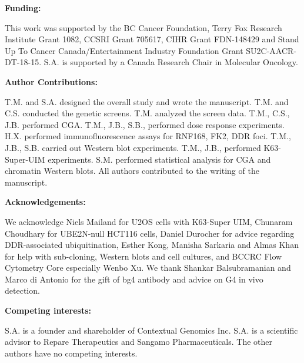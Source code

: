 \textbf{Funding:  }

This work was supported by the BC Cancer Foundation, Terry Fox Research Institute Grant 1082, CCSRI Grant 705617, CIHR Grant FDN-148429 and Stand Up To Cancer Canada/Entertainment Industry Foundation Grant SU2C-AACR-DT-18-15. S.A. is supported by a Canada Research Chair in Molecular Oncology.

\textbf{Author Contributions:  }

T.M. and S.A. designed the overall study and wrote the manuscript. T.M. and C.S. conducted the genetic screens. T.M. analyzed the screen data. T.M., C.S., J.B. performed CGA. T.M., J.B., S.B., performed dose response experiments. H.X. performed immunofluorescence assays for RNF168, FK2, DDR foci. T.M., J.B., S.B. carried out Western blot experiments. T.M., J.B., performed K63-Super-UIM experiments. S.M. performed statistical analysis for CGA and chromatin Western blots. All authors contributed to the writing of the manuscript.    

\textbf{Acknowledgements:  }

We acknowledge Niels Mailand for U2OS cells with K63-Super UIM, Chunaram Choudhary for UBE2N-null HCT116 cells, Daniel Durocher for advice regarding DDR-associated ubiquitination, Esther Kong, Manisha Sarkaria and Almas Khan for help with sub-cloning, Western blots and cell cultures, and BCCRC Flow Cytometry Core especially Wenbo Xu. We thank Shankar Balsubramanian and Marco di Antonio for the gift of bg4 antibody and advice on G4 in vivo detection.

\textbf{Competing interests:  }

S.A. is a founder and shareholder of Contextual Genomics Inc. S.A. is a scientific advisor to Repare Therapeutics and Sangamo Pharmaceuticals. The other authors have no competing interests.

